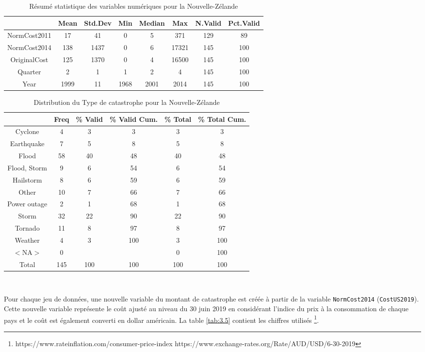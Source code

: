 \documentclass[11pt]{report}
\numberwithin{equation}{section}
\begin{document}
\begin{table}[ht]
\centering
\begin{tabular}{cccccccc}
  \hline
 & Mean & Std.Dev & Min & Median & Max & N.Valid & Pct.Valid \\ 
  \hline
NormCost2011 & 17 & 41 & 0 & 5 & 371 & 129 & 89 \\ 
  NormCost2014 & 138 & 1437 & 0 & 6 & 17321 & 145 & 100 \\ 
  OriginalCost & 125 & 1370 & 0 & 4 & 16500 & 145 & 100 \\ 
  Quarter & 2 & 1 & 1 & 2 & 4 & 145 & 100 \\ 
  Year & 1999 & 11 & 1968 & 2001 & 2014 & 145 & 100 \\ 
   \hline
\end{tabular}
\caption{Résumé statistique des variables numériques pour la Nouvelle-Zélande} 
\label{tab:3.3}
\end{table}%
\begin{table}[ht]
\centering
\begin{tabular}{cccccc}
  \hline
 & Freq & \% Valid & \% Valid Cum. & \% Total & \% Total Cum. \\ 
  \hline
Cyclone & 4 & 3 & 3 & 3 & 3 \\ 
  Earthquake & 7 & 5 & 8 & 5 & 8 \\ 
  Flood & 58 & 40 & 48 & 40 & 48 \\ 
  Flood, Storm & 9 & 6 & 54 & 6 & 54 \\ 
  Hailstorm & 8 & 6 & 59 & 6 & 59 \\ 
  Other & 10 & 7 & 66 & 7 & 66 \\ 
  Power outage & 2 & 1 & 68 & 1 & 68 \\ 
  Storm & 32 & 22 & 90 & 22 & 90 \\ 
  Tornado & 11 & 8 & 97 & 8 & 97 \\ 
  Weather & 4 & 3 & 100 & 3 & 100 \\ 
  $<$NA$>$ & 0 &  &  & 0 & 100 \\ 
  Total & 145 & 100 & 100 & 100 & 100 \\ 
   \hline
\end{tabular}
\caption{Distribution du Type de catastrophe pour la Nouvelle-Zélande} 
\label{tab:3.4}
\end{table}\

Pour chaque jeu de données, une nouvelle variable du montant de catastrophe est créée à partir de la variable \texttt{NormCost2014} (\texttt{CostUS2019}). Cette nouvelle variable représente le coût ajusté au niveau du 30 juin 2019 en considérant l'indice du prix à la consommation de chaque pays et le coût est également converti en dollar américain. La table \ref{tab:3.5} contient les chiffres utilisés \footnote{https://www.rateinflation.com/consumer-price-index  \newline https://www.exchange-rates.org/Rate/AUD/USD/6-30-2019}.
\end{document}
